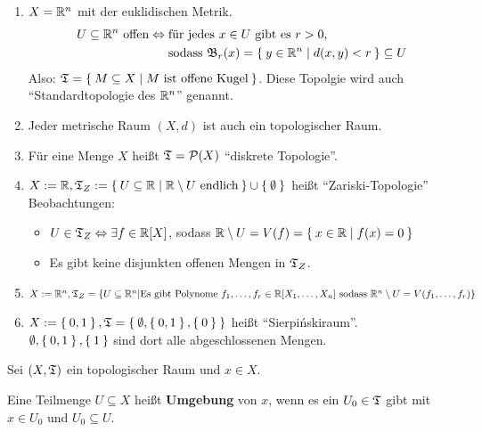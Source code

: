 \begin{beispiel}
    \begin{enumerate}[label=\arabic*)]
        \item $X = \mathbb{R}^n$ mit der euklidischen Metrik. 
              \begin{align*}
                U \subseteq \mathbb{R}^n \text{ offen} \Leftrightarrow\;&\text{für jedes $x \in U$ gibt es $r > 0$,}\\
                                                       &\text{sodass $\mathfrak{B}_r(x) = \Set{y \in \ensuremath{\mathbb{R}}^n | d(x,y) < r} \subseteq U$}
              \end{align*}
              Also: $\mathfrak{T} = \Set{M \subseteq X | M \text{ ist offene Kugel}}$. 
              Diese Topolgie wird auch \enquote{Standardtopologie des $\mathbb{R}^n$} genannt.
        \item Jeder metrische Raum $(X, d)$ ist auch ein topologischer Raum.
        \item Für eine Menge $X$ heißt $\mathfrak{T} = \mathcal{P}(X)$ \enquote{diskrete Topologie}.
        \item $X :=\mathbb{R}, \mathfrak{T}_Z := \Set{U \subseteq \ensuremath{\mathbb{R}}| \ensuremath{\mathbb{R}}\setminus U \text{ endlich}} \cup \Set{\emptyset}$ heißt \enquote{Zariski-Topologie} \\
              Beobachtungen: 
            \begin{itemize}
                \item $U \in \mathfrak{T}_Z \Leftrightarrow \exists f \in \mathbb{R}[X]$, sodass $\mathbb{R} \setminus U = V(f) = \Set{x \in \ensuremath{\mathbb{R}}| f(x) = 0}$
                \item Es gibt keine disjunkten offenen Mengen in $\mathfrak{T}_Z$.
            \end{itemize}
        \item $X := \mathbb{R}^n, \mathfrak{T}_Z = \{U \subseteq \mathbb{R}^n | \text{Es gibt Polynome } f_1, \dots, f_r \in \mathbb{R}[X_1, \dots, X_n] \text{ sodass }\\\mathbb{R}^n \setminus U = V(f_1, \dots, f_r)\}$
        \item $X := \Set{0,1}, \mathfrak{T} = \Set{\emptyset, \Set{0,1}, \Set{0}}$ heißt \enquote{Sierpińskiraum}.\\
              $\emptyset, \Set{0,1}, \Set{1}$ sind dort alle abgeschlossenen Mengen.
    \end{enumerate}
\end{beispiel}

\begin{definition} 
    Sei $(X, \mathfrak{T})$ ein topologischer Raum und $x \in X$.

    Eine Teilmenge $U \subseteq X$ heißt \textbf{Umgebung} von $x$,
    wenn es ein $U_0 \in \mathfrak{T}$ gibt mit $x \in U_0$ und $U_0 \subseteq U$.
\end{definition}

